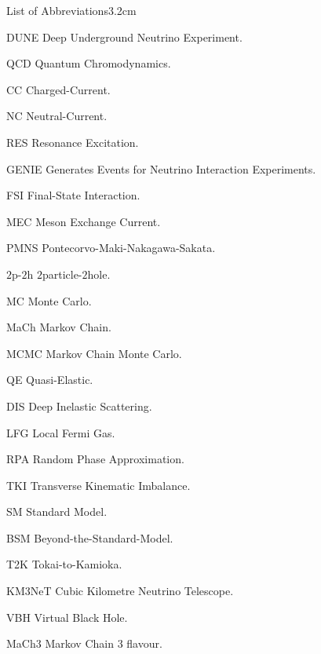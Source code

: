 \begin{mclistof}{List of Abbreviations}{3.2cm}

\item[DUNE]\hypertarget{abbr:dune}{} Deep Underground Neutrino Experiment.
\item[QCD]\hypertarget{abbr:qcd}{} Quantum Chromodynamics.
\item[CC]\hypertarget{abbr:cc}{} Charged-Current.
\item[NC]\hypertarget{abbr:nc}{} Neutral-Current.
\item[RES]\hypertarget{abbr:res}{} Resonance Excitation.
\item[GENIE]\hypertarget{abbr:genie}{} Generates Events for Neutrino Interaction Experiments.
\item[FSI]\hypertarget{abbr:fsi}{} Final-State Interaction.
\item[MEC]\hypertarget{abbr:mec}{} Meson Exchange Current.
\item[PMNS]\hypertarget{abbr:pmns}{} Pontecorvo-Maki-Nakagawa-Sakata.
\item[$2$p-$2$h]\hypertarget{abbr:2p2h}{} $2$particle-$2$hole.
\item[MC]\hypertarget{abbr:mc}{} Monte Carlo.
\item[MaCh]\hypertarget{abbr:mach}{} Markov Chain.
\item[MCMC]\hypertarget{abbr:mcmc}{} Markov Chain Monte Carlo.
\item[QE]\hypertarget{abbr:qe}{} Quasi-Elastic.
\item[DIS]\hypertarget{abbr:dis}{} Deep Inelastic Scattering.
\item[LFG]\hypertarget{abbr:lfg}{} Local Fermi Gas.
\item[RPA]\hypertarget{abbr:rpa}{} Random Phase Approximation.
\item[TKI]\hypertarget{abbr:tki}{} Transverse Kinematic Imbalance.
\item[SM]\hypertarget{abbr:sm}{} Standard Model.
\item[BSM]\hypertarget{abbr:bsm}{} Beyond-the-Standard-Model.
\item[T2K]\hypertarget{abbr:t2k}{} Tokai-to-Kamioka.
\item[KM$3$NeT]\hypertarget{abbr:km3net}{} Cubic Kilometre Neutrino Telescope.
\item[VBH]\hypertarget{abbr:vbh}{} Virtual Black Hole.
\item[MaCh3]\hypertarget{abbr:mach3}{} Markov Chain $3$ flavour.

\end{mclistof}
